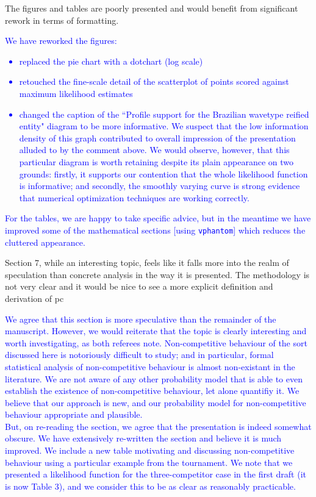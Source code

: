 \documentclass[12pt]{article}
\begin{document}
  
The figures and tables are poorly presented and would benefit from
significant rework in terms of formatting.

\textcolor{blue}{We have reworked the figures:
  \begin{itemize}
  \item replaced the pie chart with a dotchart (log scale)
  \item retouched the fine-scale detail of the scatterplot of points scored 
    against maximum likelihood estimates
  \item changed the caption of the ``Profile support for the Brazilian
    wavetype reified entity" diagram to be more informative.  We
    suspect that the low information density of this graph contributed
    to overall impression of the presentation alluded to by the
    comment above.  We would observe, however, that this particular
    diagram is worth retaining despite its plain appearance on two
    grounds: firstly, it supports our contention that the whole
    likelihood function is informative; and secondly, the smoothly
    varying curve is strong evidence that numerical optimization
    techniques are working correctly.
  \end{itemize}
  For the tables, we are happy to take specific advice, but in the
  meantime we have improved  some of the mathematical sections [using
    {\tt vphantom}] which reduces the cluttered appearance.
}

Section 7, while an interesting topic, feels like it falls more into
the realm of speculation than concrete analysis in the way it is
presented. The methodology is not very clear and it would be nice to
see a more explicit definition and derivation of pc

\textcolor{blue}{We agree that this section is more speculative than
  the remainder of the manuscript.  However, we would reiterate that
  the topic is clearly interesting and worth investigating, as both
  referees note.  Non-competitive behaviour of the sort discussed here
  is notoriously difficult to study; and in particular, formal
  statistical analysis of non-competitive behaviour is almost
  non-existant in the literature.  We are not aware of any other
  probability model that is able to even establish the existence of
  non-competitive behaviour, let alone quantifiy it.  We believe that
  our approach is new, and our probability model for non-competitive
  behaviour appropriate and plausible.\\ But, on re-reading the
  section, we agree that the presentation is indeed somewhat obscure.
  We have extensively re-written the section and believe it is much
  improved.  We include a new table motivating and discussing
  non-competitive behaviour using a particular example from the
  tournament.  We note that we presented a likelihood function for the
  three-competitor case in the first draft (it is now Table 3), and we
  consider this to be as clear as reasonably practicable.}
\end{document}
